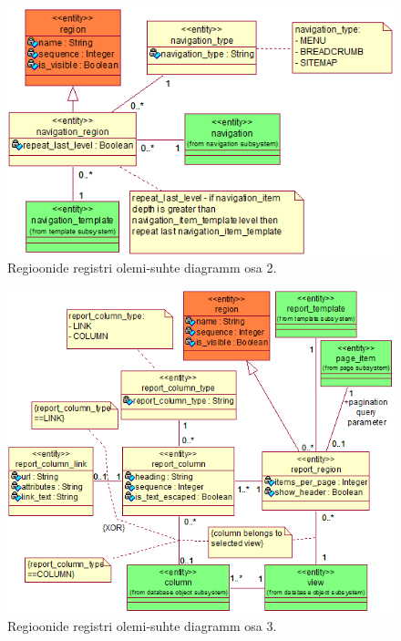 \documentclass[a4paper,12pt]{article} %
\begin{document}
\begin{figure}[H]
\centering
\includegraphics[width=\textwidth]{./diagrams/navigation-region-er-diagram.png}
\caption{Regioonide registri olemi-suhte diagramm osa 2.}
\label{fig_navigatsiooni_regioonide_registri_olemi_suhte_diagramm}
\end{figure}

\begin{figure}[H]
\centering
\includegraphics[width=\textwidth]{./diagrams/report-region-er-diagram.png}
\caption{Regioonide registri olemi-suhte diagramm osa 3.}
\label{fig_raportite_regioonide_registri_olemi_suhte_diagramm}
\end{figure}
\end{document}
